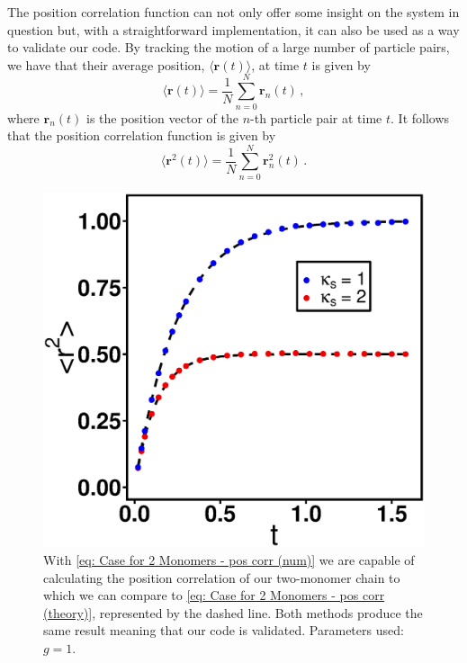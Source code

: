 \documentclass[../../main.tex]{subfiles}
\begin{document}
    The position correlation function can not only offer some insight on the system in question but, with a straightforward implementation, it can also be used as a way to validate our code. By tracking the motion of a large number of particle pairs, we have that their average position, $\langle \mathbf{r}(t) \rangle$, at time $t$ is given by
        \begin{equation}
            \langle \mathbf{r}(t) \rangle = \frac{1}{N} \sum_{n = 0}^N \mathbf{r}_n(t) \,,
        \end{equation}
    where $\mathbf{r}_n(t)$ is the position vector of the $n$-th particle pair at time $t$. It follows that the position correlation function is given by
        \begin{equation}\label{eq: Case for 2 Monomers - pos corr (num)}
            \langle \mathbf{r}^2(t) \rangle = \frac{1}{N} \sum_{n = 0}^N \mathbf{r}_n^2(t) \,.
        \end{equation}
        \begin{figure}[h]
            \centering
            \includegraphics[scale=0.4]{Figures/mon2.eps}
            \caption{ With \cref{eq: Case for 2 Monomers - pos corr (num)} we are capable of calculating the position correlation of our two-monomer chain to which we can compare to \cref{eq: Case for 2 Monomers - pos corr (theory)}, represented by the dashed line. Both methods produce the same result meaning that our code is validated. Parameters used: $g = 1$.}
            \label{fig: 2mon chain}
        \end{figure}
   
\end{document}
